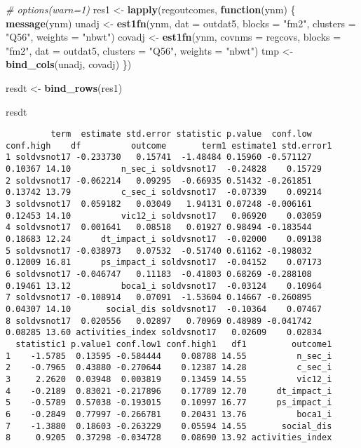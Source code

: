 \documentclass[11pt,]{article}
\newenvironment{Shaded}{\begin{snugshade}}{\end{snugshade}}
\newcommand{\CommentTok}[1]{\textcolor[rgb]{0.56,0.35,0.01}{\textit{#1}}}
\newcommand{\ControlFlowTok}[1]{\textcolor[rgb]{0.13,0.29,0.53}{\textbf{#1}}}
\newcommand{\DataTypeTok}[1]{\textcolor[rgb]{0.13,0.29,0.53}{#1}}
\newcommand{\KeywordTok}[1]{\textcolor[rgb]{0.13,0.29,0.53}{\textbf{#1}}}
\newcommand{\NormalTok}[1]{#1}
\newcommand{\StringTok}[1]{\textcolor[rgb]{0.31,0.60,0.02}{#1}}
\begin{document}
\begin{Shaded}
\begin{Highlighting}[]
\CommentTok{# options(warn=1)}
\NormalTok{res1 <-}\StringTok{ }\KeywordTok{lapply}\NormalTok{(regoutcomes, }\ControlFlowTok{function}\NormalTok{(ynm) \{}
  \KeywordTok{message}\NormalTok{(ynm)}
\NormalTok{  unadj <-}\StringTok{ }\KeywordTok{est1fn}\NormalTok{(ynm, }\DataTypeTok{dat =}\NormalTok{ outdat5, }\DataTypeTok{blocks =} \StringTok{"fm2"}\NormalTok{, }\DataTypeTok{clusters =} \StringTok{"Q56"}\NormalTok{, }\DataTypeTok{weights =} \StringTok{"nbwt"}\NormalTok{)}
\NormalTok{  covadj <-}\StringTok{ }\KeywordTok{est1fn}\NormalTok{(ynm, }\DataTypeTok{covnms =}\NormalTok{ regcovs, }\DataTypeTok{blocks =} \StringTok{"fm2"}\NormalTok{, }\DataTypeTok{dat =}\NormalTok{ outdat5, }\DataTypeTok{clusters =} \StringTok{"Q56"}\NormalTok{, }\DataTypeTok{weights =} \StringTok{"nbwt"}\NormalTok{)}
\NormalTok{  tmp <-}\StringTok{ }\KeywordTok{bind_cols}\NormalTok{(unadj, covadj)}
\NormalTok{\})}

\NormalTok{resdt <-}\StringTok{ }\KeywordTok{bind_rows}\NormalTok{(res1)}

\NormalTok{resdt}
\end{Highlighting}
\end{Shaded}

\begin{verbatim}
         term  estimate std.error statistic p.value  conf.low conf.high    df          outcome       term1 estimate1 std.error1
1 soldvsnot17 -0.233730   0.15741  -1.48484 0.15960 -0.571127   0.10367 14.10          n_sec_i soldvsnot17  -0.24828    0.15729
2 soldvsnot17 -0.062214   0.09295  -0.66935 0.51432 -0.261851   0.13742 13.79          c_sec_i soldvsnot17  -0.07339    0.09214
3 soldvsnot17  0.059182   0.03049   1.94131 0.07248 -0.006161   0.12453 14.10          vic12_i soldvsnot17   0.06920    0.03059
4 soldvsnot17  0.001641   0.08518   0.01927 0.98494 -0.183544   0.18683 12.24      dt_impact_i soldvsnot17  -0.02000    0.09138
5 soldvsnot17 -0.038973   0.07532  -0.51740 0.61162 -0.198032   0.12009 16.81      ps_impact_i soldvsnot17  -0.04152    0.07173
6 soldvsnot17 -0.046747   0.11183  -0.41803 0.68269 -0.288108   0.19461 13.12          boca1_i soldvsnot17  -0.03124    0.10964
7 soldvsnot17 -0.108914   0.07091  -1.53604 0.14667 -0.260895   0.04307 14.10       social_dis soldvsnot17  -0.10364    0.07467
8 soldvsnot17  0.020556   0.02897   0.70969 0.48989 -0.041742   0.08285 13.60 activities_index soldvsnot17   0.02609    0.02834
  statistic1 p.value1 conf.low1 conf.high1   df1         outcome1
1    -1.5785  0.13595 -0.584444    0.08788 14.55          n_sec_i
2    -0.7965  0.43880 -0.270644    0.12387 14.28          c_sec_i
3     2.2620  0.03948  0.003819    0.13459 14.55          vic12_i
4    -0.2189  0.83021 -0.217896    0.17789 12.70      dt_impact_i
5    -0.5789  0.57038 -0.193015    0.10997 16.77      ps_impact_i
6    -0.2849  0.77997 -0.266781    0.20431 13.76          boca1_i
7    -1.3880  0.18603 -0.263229    0.05594 14.55       social_dis
8     0.9205  0.37298 -0.034728    0.08690 13.92 activities_index
\end{verbatim}
\end{document}
